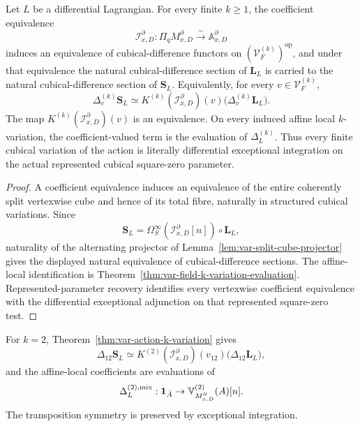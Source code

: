 \begin{theorem}
\label{thm:var-action-k-variation}
Let \(L\) be a differential Lagrangian. For every finite \(k\ge1\), the coefficient equivalence
\[
    \mathcal I^\partial_{x,D}:
    \Pi_qM^\partial_{x,D}
    \xrightarrow{\sim}
    \mathbb A^\partial_{x,D}
\]
induces an equivalence of cubical-difference functors on \((\mathcal V_F^{(k)})^{\mathrm{op}}\), and under that equivalence the natural cubical-difference section of \(\mathbf L_L\) is carried to the natural cubical-difference section of \(\mathbf S_L\). Equivalently, for every \(v\in\mathcal V_F^{(k)}\),
\[
    \boxed{
    \Delta_v^{(k)}\mathbf S_L
    \simeq
    K^{(k)}(\mathcal I^\partial_{x,D})(v)
    \bigl(\Delta_v^{(k)}\mathbf L_L\bigr).
    }
\]
The map \(K^{(k)}(\mathcal I^\partial_{x,D})(v)\) is an equivalence. On every induced affine local \(k\)-variation, the coefficient-valued term is the evaluation of \(\Delta_L^{(k)}\). Thus every finite cubical variation of the action is literally differential exceptional integration on the actual represented cubical square-zero parameter.
\end{theorem}

\begin{proof}
A coefficient equivalence induces an equivalence of the entire coherently split vertexwise cube and hence of its total fibre, naturally in structured cubical variations. Since
\[
    \mathbf S_L
    =
    \Omega_S^\infty(\mathcal I^\partial_{x,D}[n])\circ\mathbf L_L,
\]
naturality of the alternating projector of Lemma~\ref{lem:var-split-cube-projector} gives the displayed natural equivalence of cubical-difference sections. The affine-local identification is Theorem~\ref{thm:var-field-k-variation-evaluation}. Represented-parameter recovery identifies every vertexwise coefficient equivalence with the differential exceptional adjunction on that represented square-zero test.
\end{proof}

\begin{corollary}
\label{prop:var-action-mixed-second-variation}
For \(k=2\), Theorem~\ref{thm:var-action-k-variation} gives
\[
    \boxed{
    \Delta_{12}\mathbf S_L
    \simeq
    K^{(2)}(\mathcal I^\partial_{x,D})(v_{12})
    \bigl(\Delta_{12}\mathbf L_L\bigr),
    }
\]
and the affine-local coefficients are evaluations of
\[
    \Delta_L^{(2),\mathrm{mix}}:
    \mathbf 1_{\bar A}\to\mathbb V^{(2)}_{M^\partial_{x,D}}(A)[n].
\]
The transposition symmetry is preserved by exceptional integration.
\end{corollary}

